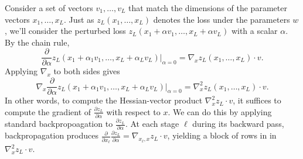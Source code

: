 \documentclass{article}
\begin{document}
Consider a set of vectors $v_1,\ldots,v_L$ that match the dimensions of the parameter vectors $x_1,\ldots,x_L$. Just as
$z_L(x_1,\ldots,x_L)$ denotes the loss under the parameters $w$, we'll consider the perturbed loss $z_L(x_1+\alpha v_1,
    \ldots, x_L+\alpha v_L)$ with a scalar $\alpha$. By the chain rule,
\begin{equation}
    \frac{\partial}{\partial \alpha} z_L(x_1+\alpha_1 v_1, \ldots, x_L+\alpha_L v_L) \bigg|_{\alpha=0} =
    \nabla_x z_L(x_1, \ldots, x_L) \cdot v.
\end{equation}
Applying $\nabla_x$ to both sides gives
\begin{equation}
    \nabla_x \frac{\partial}{\partial \alpha} z_L(x_1+\alpha_1 v_1, \ldots, x_L+\alpha_L v_L) \bigg|_{\alpha=0} =
    \nabla_x^2 z_L(x_1, \ldots, x_L) \cdot v.
\end{equation}
In other words, to compute the Hessian-vector product $\nabla_x^2 z_L \cdot v$,
it suffices to compute the gradient of $\frac{\partial z_L}{\partial \alpha} $
with respect to $x$.  We can do this by applying standard backpropoagation
to $\frac{\partial z_L}{\partial \alpha}$. At each stage $\ell$ during its
backward pass, backpropagation produces $\frac{\partial}{\partial x_\ell}
    \frac{\partial z_L}{\partial \alpha} = \nabla_{x_\ell, x} z_L \cdot v$, yielding
a block of rows in in $\nabla_x^2 z_L \cdot v$.
\end{document}
